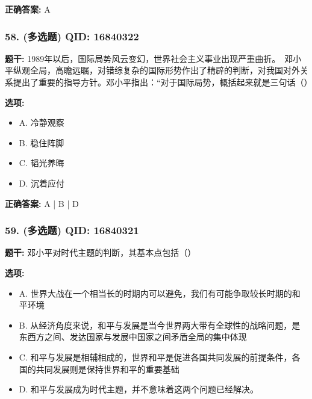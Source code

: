 \documentclass[12pt,UTF8]{ctexart}
\begin{document}
\textbf{正确答案:}
A

\vspace{0.3em}\hrulefill\vspace{0.7em}

\subsubsection*{58. (多选题) \small QID: 16840322}

\textbf{题干:}
1989年以后，国际局势风云变幻，世界社会主义事业出现严重曲折。　邓小平纵观全局，高瞻远瞩，对错综复杂的国际形势作出了精辟的判断，对我国对外关系提出了重要的指导方针。邓小平指出：“对于国际局势，概括起来就是三句话（）

\textbf{选项:}
\begin{itemize}[leftmargin=*]

  \item A. 冷静观察

  \item B. 稳住阵脚

  \item C. 韬光养晦

  \item D. 沉着应付

\end{itemize}

\textbf{正确答案:}
A | B | D

\vspace{0.3em}\hrulefill\vspace{0.7em}

\subsubsection*{59. (多选题) \small QID: 16840321}

\textbf{题干:}
邓小平对时代主题的判断，其基本点包括（）

\textbf{选项:}
\begin{itemize}[leftmargin=*]

  \item A. 世界大战在一个相当长的时期内可以避免，我们有可能争取较长时期的和平环境

  \item B. 从经济角度来说，和平与发展是当今世界两大带有全球性的战略问题，是东西方之间、发达国家与发展中国家之间矛盾全局的集中体现

  \item C. 和平与发展是相辅相成的，世界和平是促进各国共同发展的前提条件，各国的共同发展则是保持世界和平的重要基础

  \item D. 和平与发展成为时代主题，并不意味着这两个问题已经解决。

\end{itemize}
\end{document}
